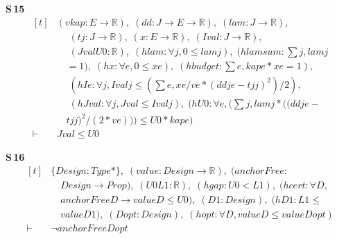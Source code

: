 \noindent\textbf{S\,15}\quad{}
{\footnotesize\[ \begin{aligned}[t]
&(\mathit{v} \mathit{kap} : \mathit{E} \to \mathbb{R} ),\; (\mathit{dd} : \mathit{J} \to \mathit{E} \to \mathbb{R} ),\; (\mathit{lam} : \mathit{J} \to \mathbb{R} ),\\
&\quad \; (\mathit{tj} : \mathit{J} \to \mathbb{R} ),\; (\mathit{x} : \mathit{E} \to \mathbb{R} ),\; (\mathit{Ival} : \mathit{J} \to \mathbb{R} ),\\
&\quad \; (\mathit{Jval} \mathit{U0} : \mathbb{R} ),\; (\mathit{hlam} : \forall \mathit{j}, 0 \leq \mathit{lam} \mathit{j}),\; (\mathit{hlamsum} : \textstyle\sum \mathit{j}, \mathit{lam} \mathit{j}\\
&\quad = 1),\; (\mathit{hx} : \forall \mathit{e}, 0 \leq \mathit{x} \mathit{e}),\; (\mathit{hbudget} : \textstyle\sum \mathit{e}, \mathit{kap} \mathit{e} * \mathit{x} \mathit{e} = 1),\\
&\quad \; (\mathit{hIe} : \forall \mathit{j}, \mathit{Ival} \mathit{j} \leq (\textstyle\sum \mathit{e}, \mathit{x} \mathit{e} / \mathit{v} \mathit{e} * (\mathit{dd} \mathit{j} \mathit{e} - \mathit{tj} \mathit{j}) ^{2}) / 2),\\
&\quad \; (\mathit{hJval} : \forall \mathit{j}, \mathit{Jval} \leq \mathit{Ival} \mathit{j}),\; (\mathit{hU0} : \forall \mathit{e}, (\textstyle\sum \mathit{j}, \mathit{lam} \mathit{j} * ((\mathit{dd} \mathit{j} \mathit{e} -\\
&\quad \mathit{tj} \mathit{j}) ^{2} / (2 * \mathit{v} \mathit{e}))) \leq \mathit{U0} * \mathit{kap} \mathit{e})\\
\vdash\;&\mathit{Jval} \leq \mathit{U0}
\end{aligned} \]}

\noindent\textbf{S\,16}\quad{}
{\footnotesize\[ \begin{aligned}[t]
&\{ \mathit{Design} : \mathit{Type}*\},\; (\mathit{value} : \mathit{Design} \to \mathbb{R} ),\; (\mathit{anchorFree} :\\
&\quad \mathit{Design} \to \mathit{Prop}),\; (\mathit{U0} \mathit{L1} : \mathbb{R} ),\; (\mathit{hgap} : \mathit{U0} < \mathit{L1}),\; (\mathit{hcert} : \forall \mathit{D},\\
&\quad \mathit{anchorFree} \mathit{D} \to \mathit{value} \mathit{D} \leq \mathit{U0}),\; (\mathit{D1} : \mathit{Design}),\; (\mathit{hD1} : \mathit{L1} \leq\\
&\quad \mathit{value} \mathit{D1}),\; (\mathit{Dopt} : \mathit{Design}),\; (\mathit{hopt} : \forall \mathit{D}, \mathit{value} \mathit{D} \leq \mathit{value} \mathit{Dopt})\\
\vdash\;&\neg \mathit{anchorFree} \mathit{Dopt}
\end{aligned} \]}

